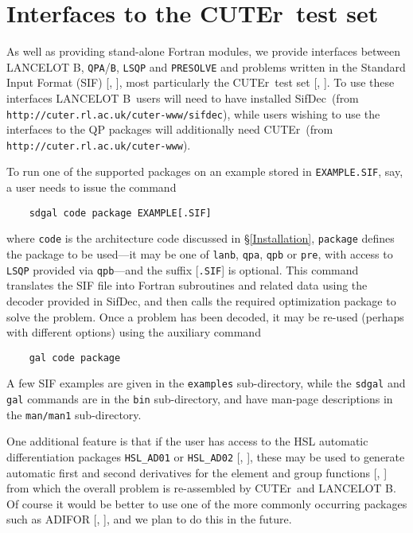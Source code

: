 \documentclass[acmtocl,acmnow]{acmtrans2m}
\newcommand{\lanb}{{\sf LANCELOT B}}
\newcommand{\cuter}{{\sf CUTEr}}
\newcommand{\sifdec}{{\sf SifDec}}
\newcommand{\bciteb}[1]{\citeauthor{#1}, \citeyear{#1}}
\begin{document}
\section{Interfaces to the \cuter\ test set}

As well as providing stand-alone Fortran modules, we provide 
interfaces between \lanb, {\tt QPA}/{\tt B}, {\tt LSQP} and {\tt PRESOLVE} and
problems written in the Standard Input Format (SIF)
[\bciteb{ConnGoulToin92}], most particularly
the \cuter\ test set [\bciteb{GoulOrbaToin02b}]. To use these
interfaces \lanb\ users will need to have installed
\sifdec\ (from {\tt http://cuter.rl.ac.uk/cuter-www/sifdec}), 
while users wishing to use the interfaces to the QP packages 
will additionally need \cuter\
(from  {\tt http://cuter.rl.ac.uk/cuter-www}).

To run one of the supported packages on an example stored in
{\tt EXAMPLE.SIF}, say, a user needs to issue the command
\begin{verbatim}
    sdgal code package EXAMPLE[.SIF] 
\end{verbatim}
where {\tt code} is the architecture code discussed in \S\ref{Installation},
{\tt package} defines the package to be used---it may be one of {\tt lanb},
{\tt qpa}, {\tt qpb} or {\tt pre}, with access to {\tt LSQP} 
provided via {\tt qpb}---and the suffix [{\tt .SIF}] is optional.
This command translates the SIF file into Fortran subroutines and 
related data using the decoder provided in \sifdec, and then calls
the required optimization package to solve the problem. Once a problem
has been decoded, it may be re-used (perhaps with different options)
using the auxiliary command
\begin{verbatim}
    gal code package 
\end{verbatim}
A few SIF examples are given in the {\tt examples} sub-directory, while the
{\tt sdgal} and {\tt gal} commands are in the {\tt bin} sub-directory, and
have man-page descriptions in the {\tt man/man1} sub-directory.

One additional feature is that if the user has
access to the HSL automatic differentiation packages {\tt HSL\_AD01} 
or {\tt HSL\_AD02} [\bciteb{PrycReid98}], 
these may be used to generate automatic first and second derivatives
for the element and group functions [\bciteb{ConnGoulToin92}] 
from which the overall problem is re-assembled by \cuter\ and \lanb.
Of course it would be better to use one of the more 
commonly occurring packages 
such as  ADIFOR [\bciteb{BiscCarlCorlGrieHovl92}],
and we plan to do this in the future.
\end{document}
